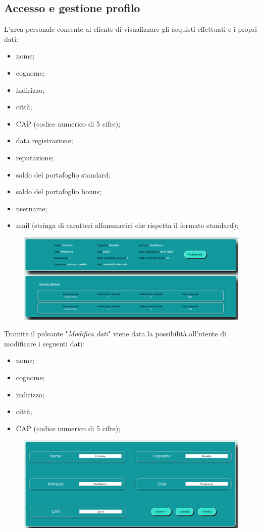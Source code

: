 \documentclass[a4paper, 14pt]{article}
\begin{document}
\begin{flushleft}
			\subsection{Accesso e gestione profilo}		
				L'area personale consente al cliente di visualizzare gli acquisti effettuati e i propri dati:
				\begin{itemize}
					\item nome;
					\item cognome;
					\item indirizzo;
					\item città;
					\item CAP (codice numerico di 5 cifre);
					\item data registrazione;
					\item reputazione;
					\item saldo del portafoglio standard;										
					\item saldo del portafoglio bonus;
					\item username;
					\item mail (stringa di caratteri alfanumerici che rispetta il formato standard);
				\end{itemize}
				\begin{figure}[H]
					\includegraphics[width=\textwidth, frame=2pt]{"screenAreaPersonale.png"}
				\end{figure}

				
				Tramite il pulsante "\textit{Modifica dati}" viene data la possibilità all'utente di modificare i seguenti dati:
				\begin{itemize}
					\item nome;
					\item cognome;
					\item indirizzo;
					\item città;
					\item CAP (codice numerico di 5 cifre);
				\end{itemize}
				\begin{figure}[H]
					\includegraphics[width=\textwidth, frame=2pt]{"screenModificaDati.png"}
				\end{figure}


\end{flushleft}
\end{document}

